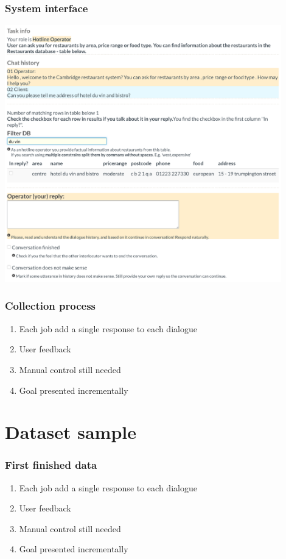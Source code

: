 \documentclass[10pt, compress,british,xcolor={svgnames,dvipsnames,x11names},trans]{beamer}
\begin{document}
\begin{frame}\frametitle{System interface}
    \includegraphics[width=0.90\textwidth]{./gui-annotators-system.png}
\end{frame}

\begin{frame}\frametitle{Collection process}
    \begin{enumerate}
        \item Each job add a single response to each dialogue 
        \item User feedback
        \item Manual control still needed
        \item Goal presented incrementally
    \end{enumerate}
\end{frame}

\section{Dataset sample}

\begin{frame}\frametitle{First finished data}
    \begin{enumerate}
        \item Each job add a single response to each dialogue 
        \item User feedback
        \item Manual control still needed
        \item Goal presented incrementally
    \end{enumerate}
\end{frame}
\end{document}
